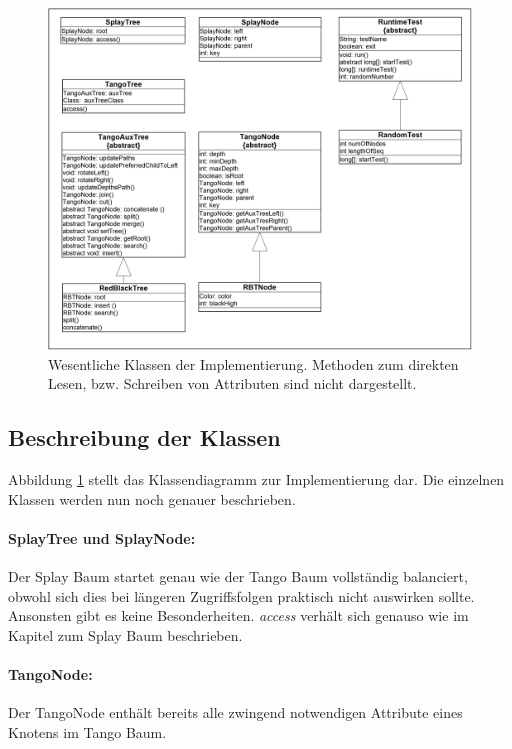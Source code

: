 \documentclass[a4paper,12pt]{article}
\begin{document}
\begin{figure}[H]
	\centering
	\includegraphics[width=1\textwidth]{Medien/laufzeittest/klassen}
	\caption{Wesentliche Klassen der Implementierung. Methoden zum direkten Lesen, bzw. Schreiben von Attributen sind nicht dargestellt. }
	\label{fig:klassen}
\end{figure}

\subsection{Beschreibung der Klassen }
Abbildung \ref{fig:klassen} stellt das Klassendiagramm zur Implementierung dar. Die einzelnen Klassen werden nun noch genauer beschrieben.
\paragraph{SplayTree und SplayNode:}
Der Splay Baum startet genau wie der Tango Baum vollständig balanciert, obwohl sich dies bei längeren Zugriffsfolgen praktisch nicht auswirken sollte. Ansonsten gibt es keine Besonderheiten. \textit{access} verhält sich genauso wie im Kapitel zum Splay Baum beschrieben. 

\paragraph{TangoNode:}
Der TangoNode enthält bereits alle zwingend notwendigen Attribute eines Knotens im Tango Baum. 
\end{document}
